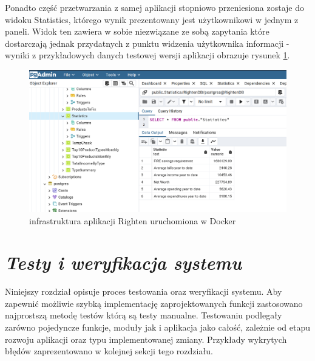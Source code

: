 \documentclass[a4paper,10pt, twoside]{report}
\newcommand{\customstylechapter}[1]{\large{\textit{#1}}}
\begin{document}
\begin{large}
{Ponadto część przetwarzania z samej aplikacji stopniowo przeniesiona zostaje do
 widoku Statistics, którego wynik prezentowany jest użytkownikowi w jednym z 
paneli. Widok ten zawiera w sobie niezwiązane ze sobą zapytania które 
dostarczają jednak przydatnych z punktu widzenia użytkownika informacji - 
wyniki z przykładowych danych testowej wersji aplikacji obrazuje rysunek 
\ref*{fig:dbwidoki-statistics}.}

\begin{figure}[H]           %
    \centering
    \includegraphics[width=12cm]{figures/RightenDB_views_statistics.png}
    \caption{infrastruktura aplikacji Righten uruchomiona w Docker}
    \label{fig:dbwidoki-statistics}
\end{figure}

\chapter{\customstylechapter{Testy i weryfikacja systemu}}
{Niniejszy rozdział opisuje proces testowania oraz weryfikacji systemu. Aby 
zapewnić możliwie szybką implementację zaprojektowanych funkcji zastosowano 
najprostszą metodę testów którą są testy manualne. Testowaniu podlegały zarówno pojedyncze funkcje, moduły jak i aplikacja jako 
całość, zależnie od etapu rozwoju aplikacji oraz typu implementowanej zmiany. 
Przykłady wykrytych błędów zaprezentowano w kolejnej sekcji tego rozdziału.}


\end{large}
\end{document}
